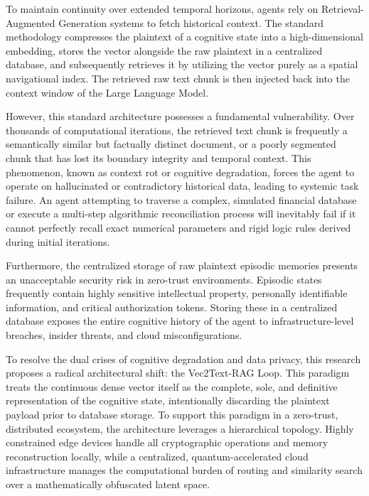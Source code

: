 \documentclass[12pt]{article}
\begin{document}
To maintain continuity over extended temporal horizons, agents rely on Retrieval-Augmented Generation systems to fetch historical context. The standard methodology compresses the plaintext of a cognitive state into a high-dimensional embedding, stores the vector alongside the raw plaintext in a centralized database, and subsequently retrieves it by utilizing the vector purely as a spatial navigational index. The retrieved raw text chunk is then injected back into the context window of the Large Language Model.

However, this standard architecture possesses a fundamental vulnerability. Over thousands of computational iterations, the retrieved text chunk is frequently a semantically similar but factually distinct document, or a poorly segmented chunk that has lost its boundary integrity and temporal context. This phenomenon, known as context rot or cognitive degradation, forces the agent to operate on hallucinated or contradictory historical data, leading to systemic task failure. An agent attempting to traverse a complex, simulated financial database or execute a multi-step algorithmic reconciliation process will inevitably fail if it cannot perfectly recall exact numerical parameters and rigid logic rules derived during initial iterations.

Furthermore, the centralized storage of raw plaintext episodic memories presents an unacceptable security risk in zero-trust environments. Episodic states frequently contain highly sensitive intellectual property, personally identifiable information, and critical authorization tokens. Storing these in a centralized database exposes the entire cognitive history of the agent to infrastructure-level breaches, insider threats, and cloud misconfigurations.

To resolve the dual crises of cognitive degradation and data privacy, this research proposes a radical architectural shift: the Vec2Text-RAG Loop. This paradigm treats the continuous dense vector itself as the complete, sole, and definitive representation of the cognitive state, intentionally discarding the plaintext payload prior to database storage. To support this paradigm in a zero-trust, distributed ecosystem, the architecture leverages a hierarchical topology. Highly constrained edge devices handle all cryptographic operations and memory reconstruction locally, while a centralized, quantum-accelerated cloud infrastructure manages the computational burden of routing and similarity search over a mathematically obfuscated latent space.
\end{document}

